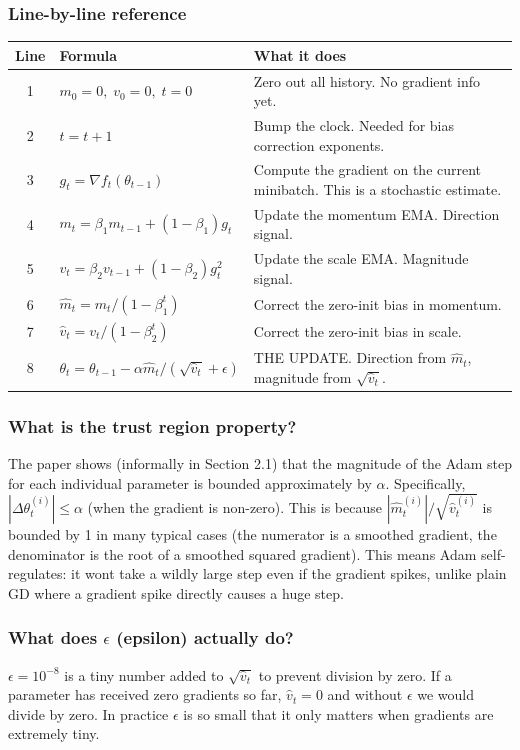 \documentclass[11pt, letterpaper]{article}
\begin{document}
\begin{deepdive}
\subsubsection{Line-by-line reference}
\begin{tabularx}{\textwidth}{c l X}
\textbf{Line} & \textbf{Formula} & \textbf{What it does} \\
\hline
1 & $m_0 = 0,\; v_0 = 0,\; t = 0$ & Zero out all history. No gradient info yet. \\
2 & $t = t + 1$ & Bump the clock. Needed for bias correction exponents. \\
3 & $g_t = \nabla f_t(\theta_{t-1})$ & Compute the gradient on the current minibatch. This is a stochastic estimate. \\
4 & $m_t = \beta_1 m_{t-1} + (1-\beta_1)g_t$ & Update the momentum EMA. Direction signal. \\
5 & $v_t = \beta_2 v_{t-1} + (1-\beta_2)g_t^2$ & Update the scale EMA. Magnitude signal. \\
6 & $\hat{m}_t = m_t / (1 - \beta_1^t)$ & Correct the zero-init bias in momentum. \\
7 & $\hat{v}_t = v_t / (1 - \beta_2^t)$ & Correct the zero-init bias in scale. \\
8 & $\theta_t = \theta_{t-1} - \alpha \hat{m}_t / (\sqrt{\hat{v}_t} + \epsilon)$ & THE UPDATE. Direction from $\hat{m}_t$, magnitude from $\sqrt{\hat{v}_t}$. \\
\end{tabularx}

\subsubsection{What is the trust region property?}
The paper shows (informally in Section 2.1) that the magnitude of the Adam step for each individual parameter is bounded approximately by $\alpha$. Specifically, $|\Delta\theta_t^{(i)}| \leq \alpha$ (when the gradient is non-zero). This is because $|\hat{m}_t^{(i)}| / \sqrt{\hat{v}_t^{(i)}}$ is bounded by 1 in many typical cases (the numerator is a smoothed gradient, the denominator is the root of a smoothed squared gradient). This means Adam self-regulates: it wont take a wildly large step even if the gradient spikes, unlike plain GD where a gradient spike directly causes a huge step.

\subsubsection{What does $\epsilon$ (epsilon) actually do?}
$\epsilon = 10^{-8}$ is a tiny number added to $\sqrt{\hat{v}_t}$ to prevent division by zero. If a parameter has received zero gradients so far, $\hat{v}_t = 0$ and without $\epsilon$ we would divide by zero. In practice $\epsilon$ is so small that it only matters when gradients are extremely tiny.


\end{deepdive}
\end{document}
